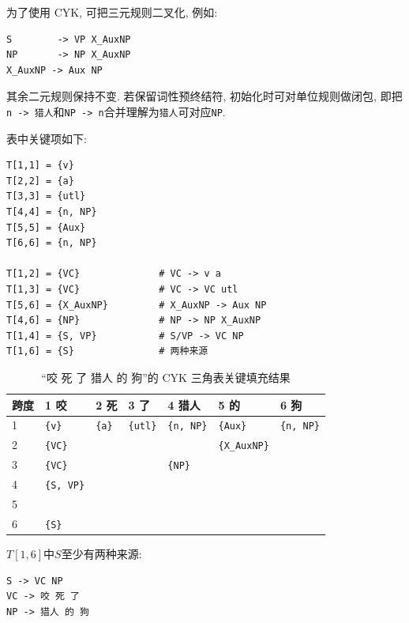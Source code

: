 为了使用 CYK, 可把三元规则二叉化, 例如:

\begin{Verbatim}[breaklines=true,breakanywhere=true,fontsize=\small]
S        -> VP X_AuxNP
NP       -> NP X_AuxNP
X_AuxNP -> Aux NP
\end{Verbatim}

其余二元规则保持不变.
若保留词性预终结符, 初始化时可对单位规则做闭包, 即把\texttt{n -\textgreater{} 猎人}和\texttt{NP -\textgreater{} n}合并理解为\texttt{猎人}可对应\texttt{NP}.

表中关键项如下:

\begin{Verbatim}[breaklines=true,breakanywhere=true,fontsize=\small]
T[1,1] = {v}
T[2,2] = {a}
T[3,3] = {utl}
T[4,4] = {n, NP}
T[5,5] = {Aux}
T[6,6] = {n, NP}

T[1,2] = {VC}              # VC -> v a
T[1,3] = {VC}              # VC -> VC utl
T[5,6] = {X_AuxNP}         # X_AuxNP -> Aux NP
T[4,6] = {NP}              # NP -> NP X_AuxNP
T[1,4] = {S, VP}           # S/VP -> VC NP
T[1,6] = {S}               # 两种来源
\end{Verbatim}

\begin{table}[H]
\centering
\begingroup
\setlength{\tabcolsep}{2pt}
\scriptsize
\caption{“咬 死 了 猎人 的 狗”的 CYK 三角表关键填充结果}
\begin{tabular}{|p{}|p{}|p{}|p{}|p{}|p{}|p{}|}
\hline
跨度 & 1 咬 & 2 死 & 3 了 & 4 猎人 & 5 的 & 6 狗 \\ \hline
1 & \texttt{\{v\}} & \texttt{\{a\}} & \texttt{\{utl\}} & \texttt{\{n, NP\}} & \texttt{\{Aux\}} & \texttt{\{n, NP\}} \\ \hline
2 & \texttt{\{VC\}} &  &  &  & \texttt{\{X\_AuxNP\}} &  \\ \hline
3 & \texttt{\{VC\}} &  &  & \texttt{\{NP\}} &  &  \\ \hline
4 & \texttt{\{S, VP\}} &  &  &  &  &  \\ \hline
5 &  &  &  &  &  &  \\ \hline
6 & \texttt{\{S\}} &  &  &  &  &  \\ \hline
\end{tabular}
\endgroup
\end{table}

$T[1,6]$中$S$至少有两种来源:

\begin{Verbatim}[breaklines=true,breakanywhere=true,fontsize=\small]
S -> VC NP
VC -> 咬 死 了
NP -> 猎人 的 狗
\end{Verbatim}

